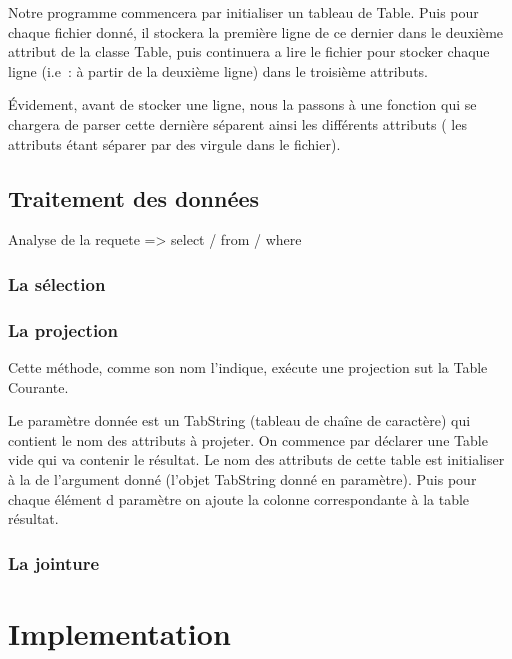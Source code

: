 \documentclass[oneside,13pt,a4paper]{report}
\begin{document}
            Notre programme commencera par initialiser un tableau de Table. Puis pour chaque fichier donné, il stockera la première ligne de ce dernier dans le deuxième attribut de la classe Table, puis continuera a lire le fichier pour stocker chaque ligne (i.e : à partir de la deuxième ligne) dans le troisième attributs.

            Évidement, avant de stocker une ligne, nous la passons à une fonction qui se chargera de parser cette dernière séparent ainsi les différents attributs ( les attributs étant séparer par des virgule dans le fichier).

        \section{Traitement des données}

            Analyse de la requete => select / from / where

            \subsection{La sélection}

            \subsection{La projection}

                Cette méthode, comme son nom l'indique, exécute une projection sut la Table Courante.

	            Le paramètre donnée est un TabString (tableau de chaîne de caractère) qui contient le nom des attributs à projeter.
                On commence par déclarer une Table vide qui va contenir le résultat.
                Le nom des attributs de cette table est initialiser à la de l'argument donné (l'objet TabString donné en paramètre).
                Puis pour chaque élément d paramètre on ajoute la colonne correspondante à la table résultat.

            \subsection{La jointure}


    \chapter{Implementation}
\end{document}
